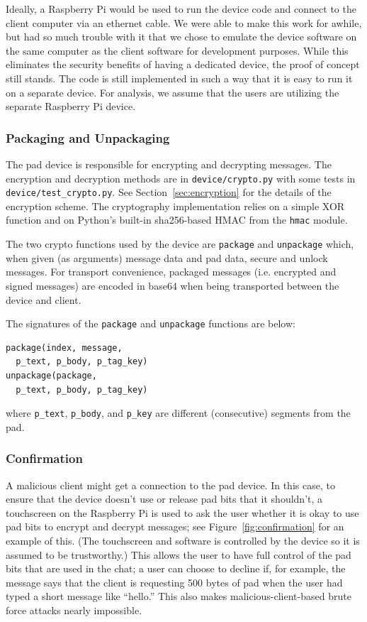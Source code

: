 \documentclass[twocolumn]{article}
\begin{document}
Ideally, a Raspberry Pi would be used to run the device code and connect to the client computer via an ethernet cable. We were able to make this work for awhile, but had so much trouble with it that we chose to emulate the device software on the same computer as the client software for development purposes. While this eliminates the security benefits of having a dedicated device, the proof of concept still stands. The code is still implemented in such a way that it is easy to run it on a separate device. For analysis, we assume that the users are utilizing the separate Raspberry Pi device.

\subsubsection{Packaging and Unpackaging}
The pad device is responsible for encrypting and decrypting messages. The encryption and decryption methods are in \texttt{device/crypto.py} with some tests in \texttt{device/test\_crypto.py}. See Section~\ref{sec:encryption} for the details of the encryption scheme. The cryptography implementation relies on a simple XOR function and on Python's built-in sha256-based HMAC from the \texttt{hmac} module.

The two crypto functions used by the device are \texttt{package} and \texttt{unpackage} which, when given (as arguments) message data and pad data, secure and unlock messages. For transport convenience, packaged messages (i.e. encrypted and signed messages) are encoded in base64 when being transported between the device and client.

The signatures of the \texttt{package} and \texttt{unpackage} functions are below:
\begin{lstlisting}
package(index, message,
  p_text, p_body, p_tag_key)
unpackage(package,
  p_text, p_body, p_tag_key)
\end{lstlisting}
where \texttt{p\_text}, \texttt{p\_body}, and \texttt{p\_key} are different (consecutive) segments from the pad.

\subsubsection{Confirmation}
A malicious client might get a connection to the pad device. In this case, to ensure that the device doesn't use or release pad bits that it shouldn't, a touchscreen on the Raspberry Pi is used to ask the user whether it is okay to use pad bits to encrypt and decrypt messages; see Figure~\ref{fig:confirmation} for an example of this. (The touchscreen and software is controlled by the device so it is assumed to be trustworthy.) This allows the user to have full control of the pad bits that are used in the chat; a user can choose to decline if, for example, the message says that the client is requesting 500 bytes of pad when the user had typed a short message like ``hello.'' This also makes malicious-client-based brute force attacks nearly impossible.
\end{document}
